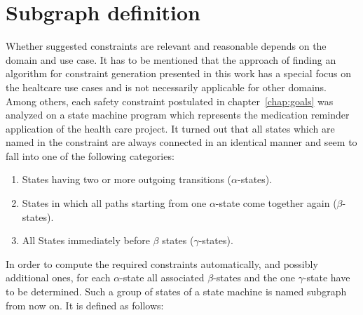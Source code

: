 \section{Subgraph definition}
\label{sec:subgraphdefinition}

Whether suggested constraints are relevant and reasonable
depends on the domain and use case. It has to be mentioned that the approach of finding an algorithm for constraint generation presented in this work has a special focus on the healtcare use cases and is not necessarily applicable for other domains.
Among others, each safety constraint postulated in chapter~\ref{chap:goals} was analyzed on a state machine program which represents the medication reminder application of the health care project. It turned out that all states which are named in the constraint are always connected in an identical manner and seem to fall into one of the following categories:

\begin{enumerate}
	\item States having two or more outgoing transitions ($\alpha$-states).
	\item States in which all paths starting from one $\alpha$-state come together again ($\beta$-states).
	\item All States immediately before $\beta$ states ($\gamma$-states).
\end{enumerate}

In order to compute the required constraints automatically, and possibly additional ones, for each $\alpha$-state all associated $\beta$-states and the one $\gamma$-state have to be determined. Such a group of states of a state machine is named subgraph from now on. It is defined as follows:

